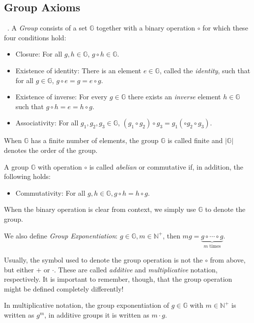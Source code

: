 \subsection{Group Axioms}\label{sec:group}
\begin{definition}~\cite{katz_introduction_2015}. A \emph{Group} consists of a set $\mathbb{G}$ together with a binary operation $\circ$ for which these four conditions hold:
    \begin{itemize}
        \item Closure: For all $g, h \in \mathbb{G}$, $g \circ h \in \mathbb{G}$.
        \item Existence of identity: There is an element $e \in \mathbb{G}$, called the \emph{identity}, such that for all $g \in \mathbb{G}$, $g \circ e = g = e \circ g$.
        \item Existence of inverse: For every $g \in \mathbb{G}$ there exists an \emph{inverse} element $h \in \mathbb{G}$ such that $g \circ h = e = h \circ g$.
        \item Associativity: For all $g_1, g_2, g_3 \in \mathbb{G}$, $(g_1 \circ g_2) \circ g_3 = g_1 (\circ g_2 \circ g_3)$.
    \end{itemize}
    When $\mathbb{G}$ has a finite number of elements, the group $\mathbb{G}$ is called finite and $|\mathbb{G}|$ denotes the order of the group.

    A group $\mathbb{G}$ with operation $\circ$ is called \emph{abelian} or commutative if, in addition, the following holds:
    \begin{itemize}
        \item Commutativity: For all $g, h \in \mathbb{G}, g \circ h = h \circ g$.
    \end{itemize}

    When the binary operation is clear from context, we simply use $\mathbb{G}$ to denote the group.

    We also define \emph{Group Exponentiation}: $g \in \mathbb{G}, m \in \mathbb{N}^+$, then $mg = \underbrace{g \circ \cdots \circ g}_{m \text{ times}}$.
\end{definition}

Usually, the symbol used to denote the group operation is not the $\circ$ from above, but either $+$ or $\cdot$. These are called \emph{additive} and \emph{multiplicative} notation, respectively.
It is important to remember, though, that the group operation might be defined completely differently!

In multiplicative notation, the group exponentiation of $g \in \mathbb{G}$ with $m \in \mathbb{N}^+$ is written as $g^m$, in additive groups it is written as $m \cdot g$.

